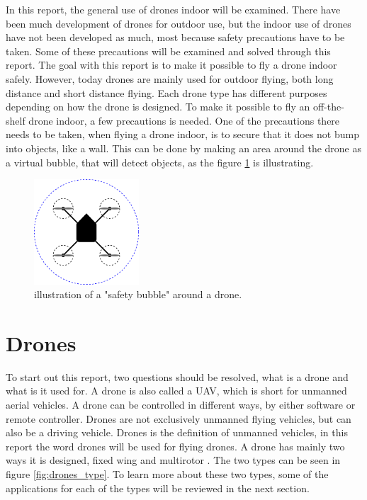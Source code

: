 In this report, the general use of drones indoor will be examined. There have been much development of drones for outdoor use, but the indoor use of drones have not been developed as much, most because safety precautions have to be taken.
Some of these precautions will be examined and solved through this report. The goal with this report is to make it possible to fly a drone indoor safely. \newline
However, today drones are mainly used for outdoor flying, both long distance and short distance flying. Each drone type has different purposes depending on how the drone is designed.
\newline
To make it possible to fly an off-the-shelf drone indoor, a few precautions is needed. 
One of the precautions there needs to be taken, when flying a drone indoor, is to secure that it does not bump into objects, like a wall. This can be done by making an area around the drone as a virtual bubble, that will detect objects, as the figure \ref{fig:introSaftyBobble} is illustrating. %
\begin{figure}[H]
    \centering
    \includegraphics[width=0.35\textwidth]{figures/ch_intro/BobleOmDrone.png}
    \caption{illustration of a "safety bubble" around a drone.}
    \label{fig:introSaftyBobble}
\end{figure}





\section{Drones}\label{s:drones}
To start out this report, two questions should be resolved, what is a drone and what is it used for. 
A drone is also called a UAV, which is short for unmanned aerial vehicles. A drone can be controlled in different ways, by either software or remote controller. Drones are not exclusively unmanned flying vehicles, but can also be a driving vehicle. Drones is the definition of unmanned vehicles, in this report the word drones will be used for flying drones.   
A drone has mainly two ways it is designed, fixed wing and multirotor \cite{drones_type}. The two types can be seen in figure \ref{fig:drones_type}. To learn more about these two types, some of the applications for each of the types will be reviewed in the next section.

